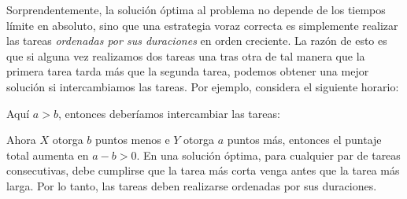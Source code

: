 Sorprendentemente, la solución óptima al problema
no depende de los tiempos límite en absoluto,
sino que una estrategia voraz correcta es simplemente
realizar las tareas \emph{ordenadas por sus duraciones}
en orden creciente.
La razón de esto es que si alguna vez realizamos
dos tareas una tras otra de tal manera que la primera tarea
tarda más que la segunda tarea,
podemos obtener una mejor solución si intercambiamos las tareas.
Por ejemplo, considera el siguiente horario:
\begin{center}
\end{center}
Aquí $a>b$, entonces deberíamos intercambiar las tareas:
\begin{center}
\end{center}
Ahora $X$ otorga $b$ puntos menos e $Y$ otorga $a$ puntos más,
entonces el puntaje total aumenta en $a-b > 0$.
En una solución óptima,
para cualquier par de tareas consecutivas,
debe cumplirse que la tarea más corta venga
antes que la tarea más larga.
Por lo tanto, las tareas deben realizarse
ordenadas por sus duraciones.

